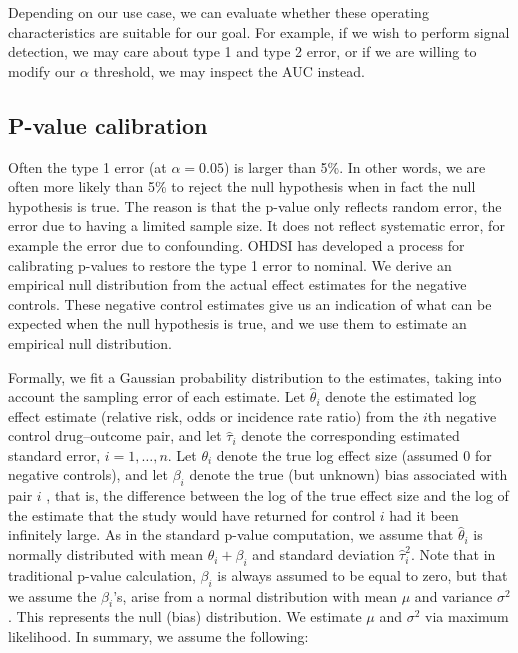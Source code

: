\documentclass[11pt]{book}
\theoremstyle{definition}
\theoremstyle{definition}
\theoremstyle{definition}
\theoremstyle{remark}
\begin{document}
Depending on our use case, we can evaluate whether these operating characteristics are suitable for our goal. For example, if we wish to perform signal detection, we may care about type 1 and type 2 error, or if we are willing to modify our \(\alpha\) threshold, we may inspect the AUC instead.

\hypertarget{p-value-calibration}{%
\subsection{P-value calibration}\label{p-value-calibration}}

Often the type 1 error (at \(\alpha = 0.05\)) is larger than 5\%. In other words, we are often more likely than 5\% to reject the null hypothesis when in fact the null hypothesis is true. The reason is that the p-value only reflects random error, the error due to having a limited sample size. It does not reflect systematic error, for example the error due to confounding. OHDSI has developed a process for calibrating p-values to restore the type 1 error to nominal. \citep{schuemie_2014} We derive an empirical null distribution from the actual effect estimates for the negative controls. These negative control estimates give us an indication of what can be expected when the null hypothesis is true, and we use them to estimate an empirical null distribution.

Formally, we fit a Gaussian probability distribution to the estimates, taking into account the sampling error of each estimate. Let \(\hat{\theta}_i\) denote the estimated log effect estimate (relative risk, odds or incidence rate ratio) from the \(i\)th negative control drug--outcome pair, and let \(\hat{\tau}_i\) denote the corresponding estimated standard error, \(i=1,\ldots,n\). Let \(\theta_i\) denote the true log effect size (assumed 0 for negative controls), and let \(\beta_i\) denote the true (but unknown) bias associated with pair \(i\) , that is, the difference between the log of the true effect size and the log of the estimate that the study would have returned for control \(i\) had it been infinitely large. As in the standard p-value computation, we assume that \(\hat{\theta}_i\) is normally distributed with mean \(\theta_i + \beta_i\) and standard deviation \(\hat{\tau}_i^2\). Note that in traditional p-value calculation, \(\beta_i\) is always assumed to be equal to zero, but that we assume the \(\beta_i\)'s, arise from a normal distribution with mean \(\mu\) and variance \(\sigma^2\). This represents the null (bias) distribution. We estimate \(\mu\) and \(\sigma^2\) via maximum likelihood. In summary, we assume the following:
\end{document}

